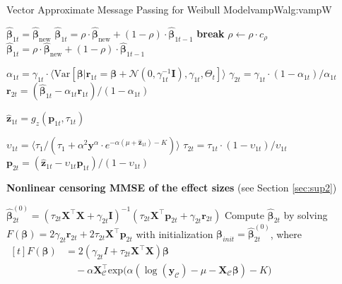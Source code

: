 \begin{breakablealgorithm}{Vector Approximate Message Passing for Weibull Model}{vampW}{alg:vampW}
\begin{algorithmic}[1]
            \STATE $\hat{\bm{\beta}}_{1t} = \hat{\bm{\beta}}_{\text{new}}$
        \ELSE
                    \STATE $\hat{\bm{\beta}}_{1t} = \rho \cdot \hat{\bm{\beta}}_{\text{new}} + (1-\rho) \cdot \hat{\bm{\beta}}_{1t-1}$
                        \STATE \textbf{break}
                    \ELSE
                        \STATE $\rho \leftarrow \rho \cdot c_{\rho}$
                    \ENDIF
                \ENDFOR
            \ELSE
                \STATE $\hat{\bm{\beta}}_{1t} = \rho \cdot \hat{\bm{\beta}}_{\text{new}} + (1-\rho) \cdot \hat{\bm{\beta}}_{1t-1}$
            \ENDIF
        \ENDIF

        \STATE $\alpha_{1t} = \gamma_{1t} \cdot \langle \text{Var}[\bm{\beta}|\bm{r}_{1t} = \bm{\beta} + \mathcal{N}(0, \gamma_{1t}^{-1}\bm{I}), \gamma_{1t}, \Theta_{t}] \rangle$ %
        \STATE $\gamma_{2t} = \gamma_{1t} \cdot (1 - \alpha_{1t}) / \alpha_{1t}$ 
        \STATE $\bm{r}_{2t} = (\hat{\bm{\beta}}_{1t} - \alpha_{1t} \bm{r}_{1t}) / (1-\alpha_{1t})$
        \item[]
        \STATE $\hat{\bm{z}}_{1t} = g_z(\bm{p}_{1t}, \tau_{1t})$

        \STATE $\upsilon_{1t} = \langle \tau_1 / ( \tau_1 + \alpha^2 \bm{y}^\alpha \cdot e^{-\alpha(\mu+\hat{\bm{z}}_{1t}) - K}) \rangle$
        \STATE $\tau_{2t} = \tau_{1t} \cdot (1 - \upsilon_{1t}) / \upsilon_{1t}$ 
        \STATE $\bm{p}_{2t} = (\hat{\bm{z}}_{1t} - \upsilon_{1t} \bm{p}_{1t}) / (1-\upsilon_{1t})$
        \item[]
            
        \STATE \textbf{Nonlinear censoring MMSE of the effect sizes} (see Section \ref{sec:sup2})

        \STATE $\hat{\bm{\beta}}_{2t}^{(0)} = ( \tau_{2t} \bm{X}^\top\bm{X} + \gamma_{2t} \bm{I} )^{-1} ( \tau_{2t} \bm{X}^\top \bm{p}_{2t} + \gamma_{2t} \bm{r}_{2t} )$ 
        \STATE Compute $\hat{\bm{\beta}}_{2t}$ by solving $F(\bm{\beta}) = 2 \gamma_{2t} \bm{r}_{2t} + 2 \tau_{2t} \bm{X}^\top \bm{p}_{2t}$ with initialization $\bm{\beta}_{init} = \hat{\bm{\beta}}_{2t}^{(0)}$, where \newline
            \quad \quad $\begin{aligned}[t] F(\bm{\beta}) & = 2(\gamma_{2t}I + \tau_{2t}\bm{X}^\top\bm{X})\bm{\beta} \\ & \quad - \alpha \bm{X}_\mathcal{C}^\top \text{exp}\Big(\alpha(\log(\bm{y}_\mathcal{C}) - \mu - \bm{X}_\mathcal{C} \bm{\beta})-K\Big) \end{aligned}$


\end{algorithmic}
\end{breakablealgorithm}
